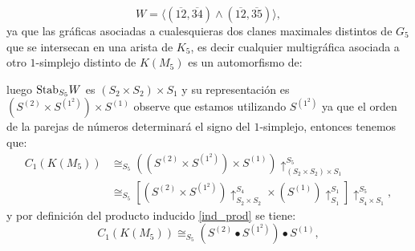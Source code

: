 \documentclass[12pt]{book}
\theoremstyle{definition}
\newcounter{in}
\newcounter{ini}
\begin{document}
 $$W = \langle (\overline{12},\overline{34}) \wedge  (\overline{12},\overline{35}) \rangle,$$
ya que las gráficas asociadas a cualesquieras dos clanes maximales distintos de $G_{5}$ que se intersecan en una arista de $K_{5}$, es decir cualquier multigráfica asociada a otro $1$-simplejo distinto de $K(M_{5})$ es un automorfismo de:
%
\begin{center}
\end{center}
luego $\textup{Stab}_{S_{5}} W$ es $(S_{2} \times S_{2}) \times S_{1}$ y su representación es $(S^{(2)} \times S^{(1^{2})}) \times S^{(1)}$ observe que estamos utilizando $S^{(1^{2})}$ ya que el orden de la parejas de números determinará el signo del $1$-simplejo, entonces tenemos que:
\begin{equation}
\begin{aligned}
C_{1}(K(M_{5})) & \cong_{S_{5}} ((S^{(2)} \times S^{(1^{2})}) \times S^{(1)})\uparrow_{(S_{2} \times S_{2}) \times S_{1}}^{S_{5}} \\
& \cong_{S_{5}} \left [ (S^{(2)} \times S^{(1^{2})})\uparrow_{S_{2} \times S_{2}}^{S_{4}} \times (S^{(1)})\uparrow_{S_{1}}^{S_{1}} \right ] \uparrow_{S_{4} \times S_{1}}^{S_{5}},
\end{aligned}
\end{equation}
y por definición del producto inducido \ref{ind_prod} se tiene:
\begin{equation}
C_{1}(K(M_{5})) \cong_{S_{5}} (S^{(2)} \bullet S^{(1^{2})}) \bullet S^{(1)}, 
\end{equation}
\end{document}

